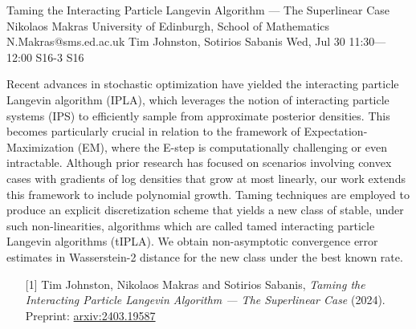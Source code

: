 \begin{talk}
  {Taming the Interacting Particle Langevin Algorithm --- The Superlinear Case}%
  {Nikolaos Makras}%
  {University of Edinburgh, School of Mathematics}%
  {N.Makras@sms.ed.ac.uk}%
  {Tim Johnston, Sotirios Sabanis}%
  {}%
  {Wed, Jul 30 11:30---12:00}%
  {S16-3}%
  {S16}%
  
    
   
Recent advances in stochastic optimization have yielded the interacting particle Langevin algorithm (IPLA), which leverages the notion of interacting particle systems (IPS) to efficiently sample from approximate posterior densities. This becomes particularly crucial in relation to the framework of Expectation-Maximization (EM), where the E-step is computationally challenging or even intractable. Although prior research has focused on scenarios involving convex cases with gradients of log densities that grow at most linearly, our work extends this framework to include polynomial growth. Taming techniques are employed to produce an explicit discretization scheme that yields a new class of stable, under such non-linearities, algorithms which are called tamed interacting particle Langevin algorithms (tIPLA). We obtain non-asymptotic convergence error estimates in Wasserstein-2 distance for the new class under the best known rate. 

\medskip

\begin{enumerate}
 \item[{[1]}] Tim Johnston, Nikolaos Makras and Sotirios Sabanis, {\it Taming the Interacting Particle Langevin Algorithm --- The Superlinear Case} (2024). Preprint: \href{https://arxiv.org/abs/2403.19587}{arxiv:2403.19587} 
\end{enumerate}

\end{talk}

